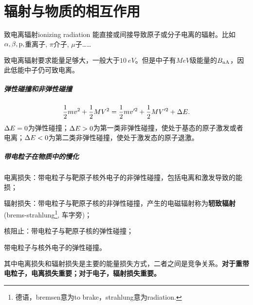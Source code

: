\chapter{辐射与物质的相互作用}

\begin{definition}{致电离辐射}{ionizing radiation}
	能直接或间接导致原子或分子电离的辐射。比如$\alpha,\beta,\mathrm p,$重离子, $\pi$介子, $\mu$子……
\end{definition}
致电离辐射要求能量足够大，一般大于$\SI{10}{eV}$。但是中子有$\si{MeV}$级能量的$B_{\mathrm n\mathrm{A}}$，因此低能中子仍可致电离。
\begin{center}
\end{center}
\paragraph{弹性碰撞和非弹性碰撞}
\[
	\frac12mv^2+\frac12MV^2=\frac12mv'^2+\frac12MV'^2+\Delta E.
\]
$\Delta E=0$为弹性碰撞；$\Delta E>0$为第一类非弹性碰撞，使处于基态的原子激发或者电离；$\Delta E<0$为第二类非弹性碰撞，使处于激发态的原子退激。
\paragraph{带电粒子在物质中的慢化}
\begin{compactenum}
	\item 电离损失：带电粒子与靶原子核外电子的非弹性碰撞，包括电离和激发导致的能损；
	\item 辐射损失：带电粒子与靶原子核的非弹性碰撞，产生的电磁辐射称为\textbf{轫致辐射}(brems-strahlung\footnote{德语，bremsen意为to brake，strahlung意为radiation.}, 车字旁)；
	\item 核阻止：带电粒子与靶原子核的弹性碰撞；
	\item 带电粒子与核外电子的弹性碰撞。
\end{compactenum}
其中电离损失和辐射损失是主要的能量损失方式，二者之间是竞争关系。\textbf{对于重带电粒子，电离损失重要；对于电子，辐射损失重要。}

